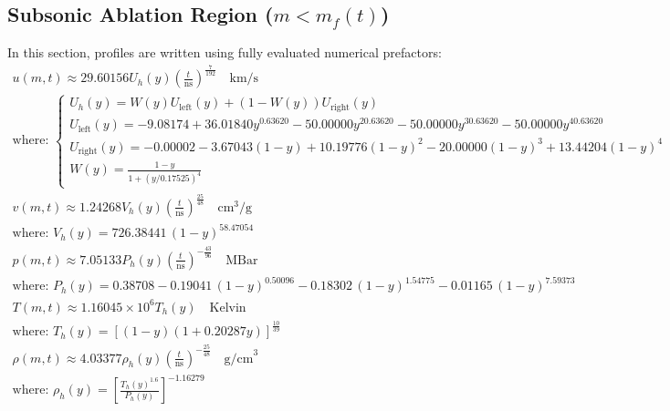 \documentclass[11pt]{article}
\begin{document}
\subsection{Subsonic Ablation Region ($m < m_f(t)$)}
In this section, profiles are written using fully evaluated numerical prefactors:
\begin{gather}
    u(m,t) \approx 29.60156 U_h(y) \left(\frac{t}{\text{ns}}\right)^{\frac{7}{192}} \quad \text{km/s} \\
    \text{where: } \begin{cases}
        U_h(y) = W(y) U_{\text{left}}(y) + (1-W(y)) U_{\text{right}}(y) \\
        U_{\text{left}}(y) = -9.08174 + 36.01840 y^{0.63620} - 50.00000 y^{2 0.63620} - 50.00000 y^{3 0.63620} - 50.00000 y^{4 0.63620} \\
        U_{\text{right}}(y) = -0.00002 - 3.67043 (1-y) + 10.19776 (1-y)^2 - 20.00000 (1-y)^3 + 13.44204 (1-y)^4 \\
        W(y) = \frac{1 - y}{1 + \left( y / 0.17525 \right)^4}
    \end{cases} \nonumber \\
    v(m,t) \approx 1.24268 V_h(y) \left(\frac{t}{\text{ns}}\right)^{\frac{25}{48}} \quad \text{cm}^3/\text{g} \\
    \text{where: } V_h(y) = 726.38441 \, (1 - y)^{58.47054} \nonumber \\
    p(m,t) \approx 7.05133 P_h(y) \left(\frac{t}{\text{ns}}\right)^{-\frac{43}{96}} \quad \text{MBar} \\
    \text{where: } P_h(y) = 0.38708 - 0.19041 \, (1-y)^{0.50096} - 0.18302 \, (1-y)^{1.54775} - 0.01165 \, (1-y)^{7.59373} \nonumber \\
    T(m,t) \approx 1.16045 \times 10^{6} T_h(y) \quad \text{Kelvin} \\
    \text{where: } T_h(y) = \left[ (1 - y)(1 + 0.20287 y) \right]^{\frac{10}{39}} \nonumber \\
    \rho(m,t) \approx 4.03377 \rho_h(y) \left(\frac{t}{\text{ns}}\right)^{-\frac{25}{48}} \quad \text{g/cm}^3 \\
    \text{where: } \rho_h(y) = \left[ \frac{T_h(y)^{1.6}}{P_h(y)} \right]^{-1.16279} \nonumber
\end{gather}
\end{document}
